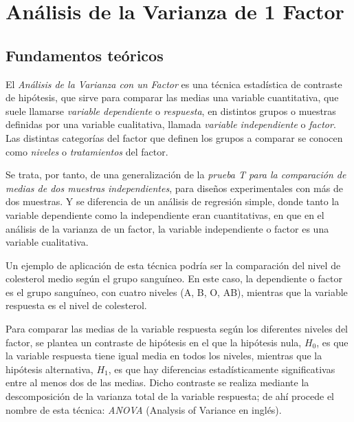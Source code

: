 
\chapter{Análisis de la Varianza de 1 Factor}

\section{Fundamentos teóricos}

El \emph{Análisis de la Varianza con un Factor} es una técnica
estadística de contraste de hipótesis, que sirve para comparar las medias una variable cuantitativa, que suele llamarse \emph{variable dependiente} o \emph{respuesta}, en distintos grupos o muestras definidas por una variable cualitativa, llamada \emph{variable independiente} o \emph{factor}. Las distintas categorías del factor que definen los grupos a comparar se conocen como \emph{niveles} o \emph{tratamientos} del factor. 

Se trata, por tanto, de una generalización de la \emph{prueba T para la comparación de medias de dos muestras independientes}, para diseños experimentales con más de dos muestras. Y se diferencia de un análisis de regresión simple, donde tanto la variable dependiente como la independiente eran cuantitativas, en que en el análisis de la varianza de un factor, la variable independiente o factor es una variable cualitativa.

Un ejemplo de aplicación de esta técnica podría ser la comparación del nivel de colesterol medio según el grupo sanguíneo. En este caso, la dependiente o factor es el grupo sanguíneo, con cuatro niveles (A, B, O, AB), mientras que la variable respuesta es el nivel de colesterol.

Para comparar las medias de la variable respuesta según los diferentes niveles del factor, se plantea un contraste de hipótesis en el que la hipótesis nula, $H_0$, es que la variable respuesta tiene igual media en todos los niveles, mientras que la hipótesis alternativa, $H_1$, es que hay diferencias
estadísticamente significativas entre al menos dos de las medias. Dicho contraste se realiza mediante la descomposición de la varianza total de la variable respuesta; de ahí procede el nombre de esta técnica: \emph{ANOVA} (Analysis of Variance en inglés).

